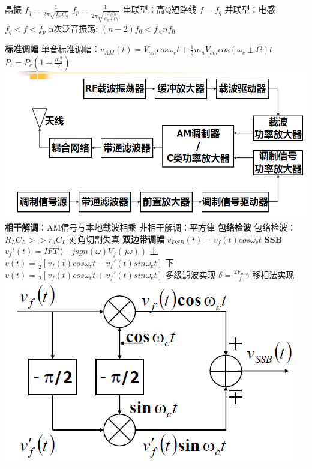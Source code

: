 \documentclass[10.5pt,landscape]{article}
\begin{document}
\begin{multicols*}{4}
晶振 $ f_q = \frac{1}{2\pi \sqrt{L_q C_q}} $\newline
$f_p = \frac{1}{2\pi \sqrt{\frac{C_q C_0}{C_q + C_0}}}$ \newline
串联型：高Q短路线 $f  = f_q$ \newline
并联型：电感 $f_q < f  < f_p$ \newline
n次泛音振荡: $ (n - 2)f_0 < f_ <  nf_0$ \newline

\textbf{标准调幅}\newline
 单音标准调幅：$v_{AM}(t) = V_{cm} cos\omega_c t + \frac{1}{2}m_aV_{cm}cos(\omega_c \pm \Omega)t$ \newline
 $P_t = P_c(1 + \frac{m_a^2}{2})$ \newline
 \includegraphics[scale=0.3]{高电平}\newline
 \textbf{相干解调}：AM信号与本地载波相乘 \newline
 非相干解调：平方律 \textbf{包络检波 }  \newline
 包络检波：$R_L C_L >> r_d C_L$ 对角切割失真 \newline
 \textbf{双边带调幅}\newline
 $v_{DSB}(t) = v_f(t) cos\omega_c t$ \newline
 \textbf{SSB}\newline
 $v_f'(t) = IFT(-jsgn(\omega)V_f(j\omega))$\newline
 上 $v(t) = \frac{1}{2}[v_f(t)cos\omega_ct - v_f'(t)sin\omega_ct]$ \newline
 下 $v(t) = \frac{1}{2}[v_f(t)cos\omega_ct + v_f'(t)sin\omega_ct]$ \newline
 多级滤波实现 $\delta = \frac{2F_{min}}{f_c}$\newline
 移相法实现  \includegraphics[scale=0.3]{移相}\newline

\end{multicols*}
\end{document}
